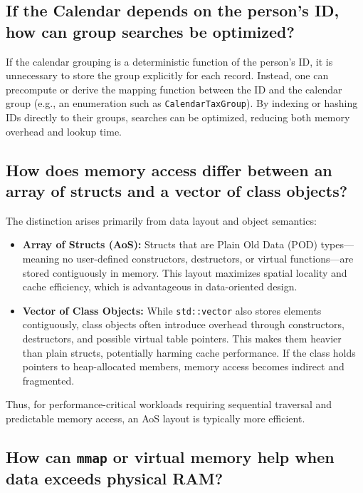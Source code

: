 \documentclass[11pt,letterpaper,oneside]{article}
\begin{document}
\subsection{If the Calendar depends on the person's ID, how can group searches be optimized?}

If the calendar grouping is a deterministic function of the person’s ID, it is
unnecessary to store the group explicitly for each record. Instead, one can
precompute or derive the mapping function between the ID and the calendar group
(e.g., an enumeration such as \texttt{CalendarTaxGroup}). By indexing or hashing
IDs directly to their groups, searches can be optimized, reducing both memory
overhead and lookup time.

\subsection{How does memory access differ between an array of structs and a vector of class objects?}

The distinction arises primarily from data layout and object semantics:

\begin{itemize}
    \item \textbf{Array of Structs (AoS):} Structs that are Plain Old Data (POD)
    types—meaning no user-defined constructors, destructors, or virtual
    functions—are stored contiguously in memory. This layout maximizes spatial
    locality and cache efficiency, which is advantageous in data-oriented
    design.
    \item \textbf{Vector of Class Objects:} While \texttt{std::vector} also
    stores elements contiguously, class objects often introduce overhead through
    constructors, destructors, and possible virtual table pointers. This makes
    them heavier than plain structs, potentially harming cache performance. If
    the class holds pointers to heap-allocated members, memory access becomes
    indirect and fragmented.
\end{itemize}

Thus, for performance-critical workloads requiring sequential traversal and
predictable memory access, an AoS layout is typically more efficient.

\subsection{How can \texttt{mmap} or virtual memory help when data exceeds
physical RAM?}
\end{document}
